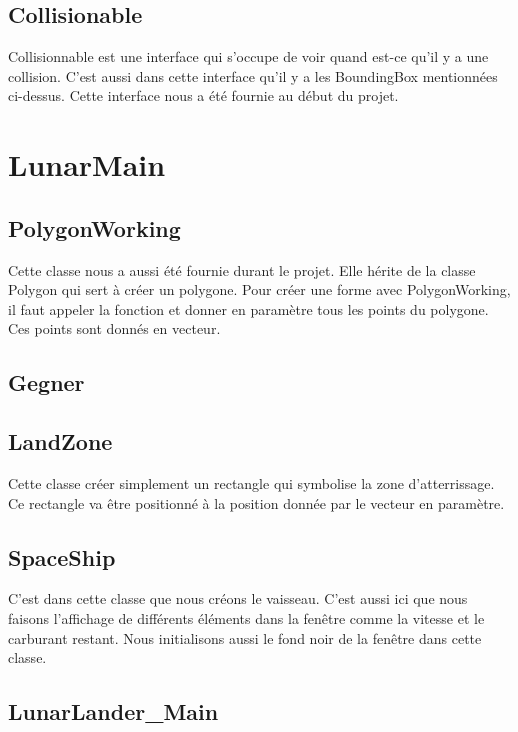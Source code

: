 \subsection{Collisionable}
Collisionnable est une interface qui s’occupe de voir quand est-ce qu’il y a une collision. C’est aussi dans cette interface qu’il y a les BoundingBox mentionnées ci-dessus. Cette interface nous a été fournie au début du projet.

\section{LunarMain}

\subsection{PolygonWorking}
Cette classe nous a aussi été fournie durant le projet. Elle hérite de la classe Polygon qui sert à créer un polygone. Pour créer une forme avec PolygonWorking, il faut appeler la fonction et donner en paramètre tous les points du polygone. Ces points sont donnés en vecteur.

\subsection{Gegner}

\subsection{LandZone}
Cette classe créer simplement un rectangle qui symbolise la zone d’atterrissage. Ce rectangle va être positionné à la position donnée par le vecteur en paramètre.

\subsection{SpaceShip}
C’est dans cette classe que nous créons le vaisseau. C’est aussi ici que nous faisons l’affichage de différents éléments dans la fenêtre comme la vitesse et le carburant restant. Nous initialisons aussi le fond noir de la fenêtre dans cette classe.

\subsection{LunarLander_Main}
